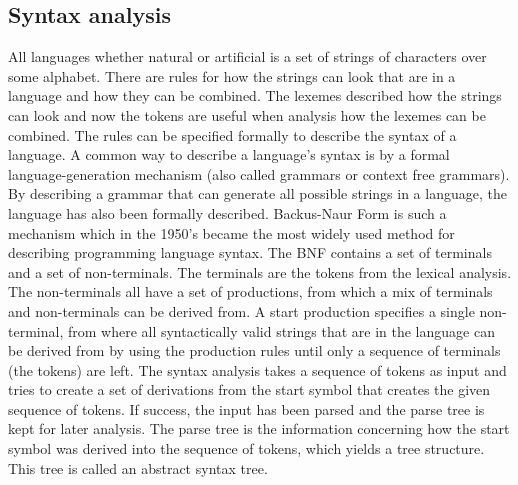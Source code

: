 \subsection{Syntax analysis}
All languages whether natural or artificial is a set of strings of characters over some alphabet. There are rules for how the strings can look that are in a language and how they can be combined. The lexemes described how the strings can look and now the tokens are useful when analysis how the lexemes can be combined. The rules can be specified formally to describe the syntax of a language\cite[p. 135]{sebesta2013}. A common way to describe a language's syntax is by a formal language-generation mechanism (also called grammars or context free grammars). By describing a grammar that can generate all possible strings in a language, the language has also been formally described. Backus-Naur Form is such a mechanism which in the 1950's became the most widely used method for describing programming language syntax\cite[p. 137]{sebesta2013}.
The BNF contains a set of terminals and a set of non-terminals. The terminals are the tokens from the lexical analysis. The non-terminals all have a set of productions, from which a mix of terminals and non-terminals can be derived from. A start production specifies a single non-terminal, from where all syntactically valid strings that are in the language can be derived from by using the production rules until only a sequence of terminals (the tokens) are left. The syntax analysis takes a sequence of tokens as input and tries to create a set of derivations from the start symbol that creates the given sequence of tokens. If success, the input has been parsed and the parse tree is kept for later analysis. The parse tree is the information concerning how the start symbol was derived into the sequence of tokens, which yields a tree structure. This tree is called an abstract syntax tree.

\begin{ebnf}
\galt{\gter{>}}
\galt{\gter{<}}
\end{ebnf}



